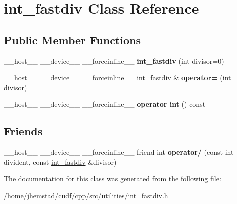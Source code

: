 \hypertarget{classint__fastdiv}{}\section{int\+\_\+fastdiv Class Reference}
\label{classint__fastdiv}
\subsection*{Public Member Functions}
\begin{DoxyCompactItemize}
\item 
\+\_\+\+\_\+host\+\_\+\+\_\+ \+\_\+\+\_\+device\+\_\+\+\_\+ \+\_\+\+\_\+forceinline\+\_\+\+\_\+ {\bfseries int\+\_\+fastdiv} (int divisor=0)\hypertarget{classint__fastdiv_a560528c0f2794f47f2773da83b028044}{}\label{classint__fastdiv_a560528c0f2794f47f2773da83b028044}

\item 
\+\_\+\+\_\+host\+\_\+\+\_\+ \+\_\+\+\_\+device\+\_\+\+\_\+ \+\_\+\+\_\+forceinline\+\_\+\+\_\+ \hyperlink{classint__fastdiv}{int\+\_\+fastdiv} \& {\bfseries operator=} (int divisor)\hypertarget{classint__fastdiv_a71930a947605a846371c6a5916a29e74}{}\label{classint__fastdiv_a71930a947605a846371c6a5916a29e74}

\item 
\+\_\+\+\_\+host\+\_\+\+\_\+ \+\_\+\+\_\+device\+\_\+\+\_\+ \+\_\+\+\_\+forceinline\+\_\+\+\_\+ {\bfseries operator int} () const \hypertarget{classint__fastdiv_a6dda53bbf58723faac668e0291a4b9b7}{}\label{classint__fastdiv_a6dda53bbf58723faac668e0291a4b9b7}

\end{DoxyCompactItemize}
\subsection*{Friends}
\begin{DoxyCompactItemize}
\item 
\+\_\+\+\_\+host\+\_\+\+\_\+ \+\_\+\+\_\+device\+\_\+\+\_\+ \+\_\+\+\_\+forceinline\+\_\+\+\_\+ friend int {\bfseries operator/} (const int divident, const \hyperlink{classint__fastdiv}{int\+\_\+fastdiv} \&divisor)\hypertarget{classint__fastdiv_a6118669b238ecacc2d6f7546e9bc0659}{}\label{classint__fastdiv_a6118669b238ecacc2d6f7546e9bc0659}

\end{DoxyCompactItemize}


The documentation for this class was generated from the following file\+:\begin{DoxyCompactItemize}
\item 
/home/jhemstad/cudf/cpp/src/utilities/int\+\_\+fastdiv.\+h\end{DoxyCompactItemize}
